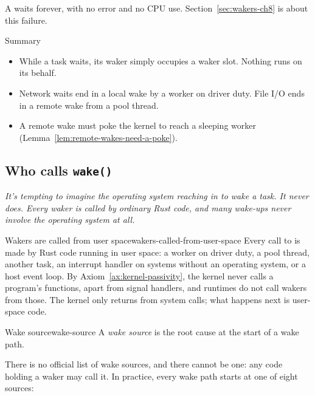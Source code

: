 A waits forever, with no error and no CPU use. Section~\ref{sec:wakers-ch8} is about this failure.

\begin{quotebox}{Summary}
    \begin{itemize}
        \item While a task waits, its waker simply occupies a waker slot. Nothing runs on its behalf.
        \item Network waits end in a local wake by a worker on driver duty. File I/O ends in a remote wake from a pool thread.
        \item A remote wake must poke the kernel to reach a sleeping worker (Lemma~\ref{lem:remote-wakes-need-a-poke}).
    \end{itemize}
\end{quotebox}

\subsection{Who calls \texorpdfstring{\texttt{wake()}}{wake()}}
\label{sec:wakers-ch6}

\textit{It's tempting to imagine the operating system reaching in to wake a task. It never does. Every waker is called by ordinary Rust code, and many wake-ups never involve the operating system at all.}

\begin{lemma}{Wakers are called from user space}{wakers-called-from-user-space}
    Every call to  is made by Rust code running in user space: a worker on driver duty, a pool thread, another task, an interrupt handler on systems without an operating system, or a host event loop.
    \why By Axiom~\ref{ax:kernel-passivity}, the kernel never calls a program's functions, apart from signal handlers, and runtimes do not call wakers from those. The kernel only returns from system calls; what happens next is user-space code.
\end{lemma}

\begin{definition}{Wake source}{wake-source}
    A \emph{wake source} is the root cause at the start of a wake path.
\end{definition}

There is no official list of wake sources, and there cannot be one: any code holding a waker may call it. In practice, every wake path starts at one of eight sources:

